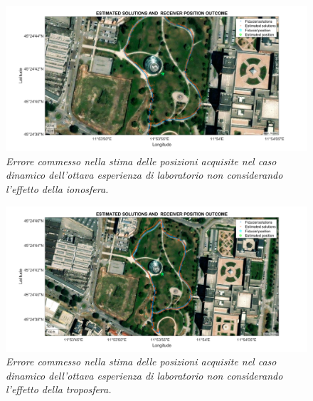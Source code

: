 \documentclass[a4paper,11pt,twoside]{book}
\begin{document}
	\begin{figure}[H]
		\centering
		\includegraphics[scale=0.30]{"Immagini workbook/Immagini esp8/err_iono_8"}
		\caption{\textit{Errore commesso nella stima delle posizioni acquisite nel caso dinamico dell'ottava esperienza di laboratorio non considerando l'effetto della ionosfera.}}
		\label{fig:erriono8}
	\end{figure}
	
	\vspace{-1cm}
	
	\begin{figure}[H]
		\centering
		\includegraphics[scale=0.30]{"Immagini workbook/Immagini esp8/err_tropo_8"}
		\caption{\textit{Errore commesso nella stima delle posizioni acquisite nel caso dinamico dell'ottava esperienza di laboratorio non considerando l'effetto della troposfera.}}
		\label{fig:errtropo8}
	\end{figure}
	
\end{document}
